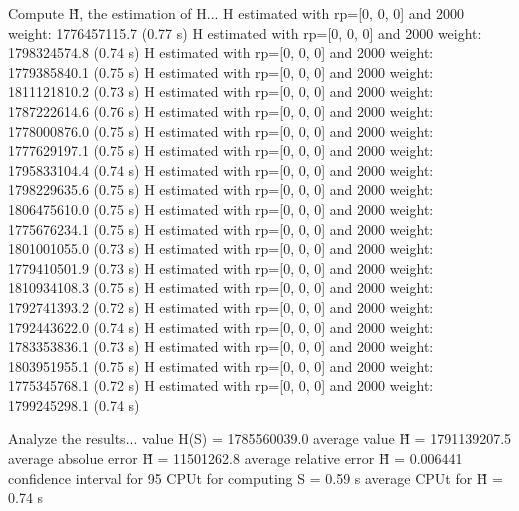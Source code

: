 Compute H̃, the estimation of H...
  H estimated with rp=[0, 0, 0] and 2000 weight:  1776457115.7  (0.77 s)
  H estimated with rp=[0, 0, 0] and 2000 weight:  1798324574.8  (0.74 s)
  H estimated with rp=[0, 0, 0] and 2000 weight:  1779385840.1  (0.75 s)
  H estimated with rp=[0, 0, 0] and 2000 weight:  1811121810.2  (0.73 s)
  H estimated with rp=[0, 0, 0] and 2000 weight:  1787222614.6  (0.76 s)
  H estimated with rp=[0, 0, 0] and 2000 weight:  1778000876.0  (0.75 s)
  H estimated with rp=[0, 0, 0] and 2000 weight:  1777629197.1  (0.75 s)
  H estimated with rp=[0, 0, 0] and 2000 weight:  1795833104.4  (0.74 s)
  H estimated with rp=[0, 0, 0] and 2000 weight:  1798229635.6  (0.75 s)
  H estimated with rp=[0, 0, 0] and 2000 weight:  1806475610.0  (0.75 s)
  H estimated with rp=[0, 0, 0] and 2000 weight:  1775676234.1  (0.75 s)
  H estimated with rp=[0, 0, 0] and 2000 weight:  1801001055.0  (0.73 s)
  H estimated with rp=[0, 0, 0] and 2000 weight:  1779410501.9  (0.73 s)
  H estimated with rp=[0, 0, 0] and 2000 weight:  1810934108.3  (0.75 s)
  H estimated with rp=[0, 0, 0] and 2000 weight:  1792741393.2  (0.72 s)
  H estimated with rp=[0, 0, 0] and 2000 weight:  1792443622.0  (0.74 s)
  H estimated with rp=[0, 0, 0] and 2000 weight:  1783353836.1  (0.73 s)
  H estimated with rp=[0, 0, 0] and 2000 weight:  1803951955.1  (0.75 s)
  H estimated with rp=[0, 0, 0] and 2000 weight:  1775345768.1  (0.72 s)
  H estimated with rp=[0, 0, 0] and 2000 weight:  1799245298.1  (0.74 s)

Analyze the results...
  value H(S)                  = 1785560039.0 
  average value H̃             = 1791139207.5 
  average absolue error H̃     = 11501262.8 
  average relative error H̃    = 0.006441 
  confidence interval for 95%
  CPUt for computing S         = 0.59 s
  average CPUt for H̃           = 0.74 s

